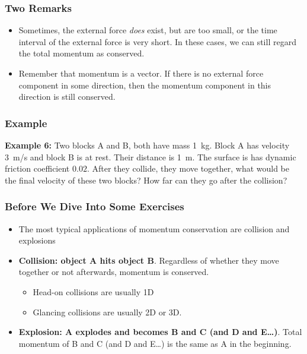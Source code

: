 \documentclass[12pt,compress,aspectratio=169]{beamer}
\begin{document}
\begin{frame}
  \frametitle{Two Remarks}
  \begin{itemize}
  \item Sometimes, the external force \emph{does} exist, but are too small, or
    the time interval of the external force is very short. In these cases, we
    can still regard the total momentum as conserved.
  \item Remember that momentum is a vector. If there is no external force
    component in some direction, then the momentum component in this
    direction is still conserved.
  \end{itemize}
\end{frame}

\begin{frame}
  \frametitle{Example}
  \textbf{Example 6:} Two blocks A and B, both have mass \SI{1}{\kg}. Block A
  has velocity \SI{3}{m/\s} and block B is at rest. Their distance is
  \SI{1}{m}. The surface is has dynamic friction coefficient $0.02$. After they
  collide, they move together, what would be the final velocity of these two
  blocks? How far can they go after the collision?
\end{frame}

%
\begin{frame}
  \frametitle{Before We Dive Into Some Exercises}
  \begin{itemize}
  \item The most typical applications of momentum conservation are collision
    and explosions
  \item\textbf{Collision: object A hits object B}. Regardless of whether they
    move together or not afterwards, momentum is conserved.
    \begin{itemize}
    \item Head-on collisions are usually 1D
    \item Glancing collisions are usually 2D or 3D.
    \end{itemize}
  \item\textbf{Explosion: A explodes and becomes B and C (and D and E\ldots)}.
    Total momentum of B and C (and D and E\ldots) is the same as A in the
    beginning. 
  \end{itemize}
\end{frame}
\end{document}
